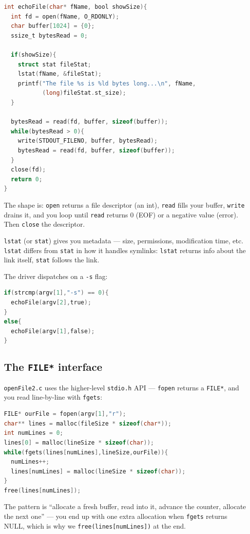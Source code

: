 \documentclass[11pt]{article}
\begin{document}
\begin{lstlisting}[language=C]
int echoFile(char* fName, bool showSize){
  int fd = open(fName, O_RDONLY);
  char buffer[1024] = {0};
  ssize_t bytesRead = 0;

  if(showSize){
    struct stat fileStat;
    lstat(fName, &fileStat);
    printf("The file %s is %ld bytes long...\n", fName,
           (long)fileStat.st_size);
  }

  bytesRead = read(fd, buffer, sizeof(buffer));
  while(bytesRead > 0){
    write(STDOUT_FILENO, buffer, bytesRead);
    bytesRead = read(fd, buffer, sizeof(buffer));
  }
  close(fd);
  return 0;
}
\end{lstlisting}

The shape is: \texttt{open} returns a file descriptor (an int),
\texttt{read} fills your buffer, \texttt{write} drains it, and
you loop until \texttt{read} returns 0 (EOF) or a negative value
(error). Then \texttt{close} the descriptor.

\texttt{lstat} (or \texttt{stat}) gives you metadata --- size,
permissions, modification time, etc. \texttt{lstat} differs from
\texttt{stat} in how it handles symlinks: \texttt{lstat} returns
info about the link itself, \texttt{stat} follows the link.

The driver dispatches on a \texttt{-s} flag:

\begin{lstlisting}[language=C]
if(strcmp(argv[1],"-s") == 0){
  echoFile(argv[2],true);
}
else{
  echoFile(argv[1],false);
}
\end{lstlisting}

\subsection*{The \texttt{FILE*} interface}

\texttt{openFile2.c} uses the higher-level \texttt{stdio.h} API ---
\texttt{fopen} returns a \texttt{FILE*}, and you read line-by-line
with \texttt{fgets}:

\begin{lstlisting}[language=C]
FILE* ourFile = fopen(argv[1],"r");
char** lines = malloc(fileSize * sizeof(char*));
int numLines = 0;
lines[0] = malloc(lineSize * sizeof(char));
while(fgets(lines[numLines],lineSize,ourFile)){
  numLines++;
  lines[numLines] = malloc(lineSize * sizeof(char));
}
free(lines[numLines]);
\end{lstlisting}

The pattern is ``allocate a fresh buffer, read into it, advance the
counter, allocate the next one'' --- you end up with one extra
allocation when \texttt{fgets} returns NULL, which is why we
\texttt{free(lines[numLines])} at the end.
\end{document}

